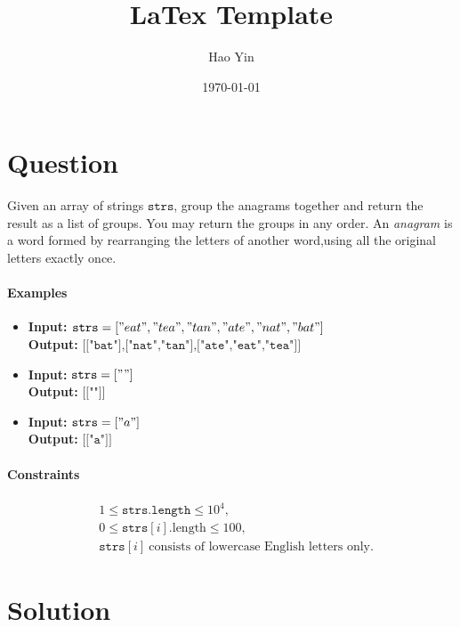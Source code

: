 \documentclass[12pt]{article}
\begin{document}
\title{LaTex Template}
\author{Hao Yin}
\date{\today}
\maketitle

\section*{Question}
    Given an array of strings \(\texttt{strs}\), group the anagrams together and
        return the result as a list of groups. You may return the groups in any 
        order. An \emph{anagram} is a word formed by rearranging the letters of 
        another word,using all the original letters exactly once.

\paragraph{Examples}
\begin{itemize}
  \item \textbf{Input:} \(\texttt{strs} = ["eat","tea","tan","ate","nat","bat"]
    \) \\ \textbf{Output:} \(\texttt{[["bat"],["nat","tan"],["ate","eat","tea"]]
    }\)
  \item \textbf{Input:} \(\texttt{strs} = [""]\) \\
        \textbf{Output:} \(\texttt{[[""]]}\)
  \item \textbf{Input:} \(\texttt{strs} = ["a"]\) \\
        \textbf{Output:} \(\texttt{[["a"]]}\)
\end{itemize}

\paragraph{Constraints}
\[
\begin{aligned}
&1 \le \texttt{strs.length} \le 10^{4},\\
&0 \le \texttt{strs}[i].\text{length} \le 100,\\
&\texttt{strs}[i]\ \text{consists of lowercase English letters only.}
\end{aligned}
\]

\section*{Solution}
\end{document}
